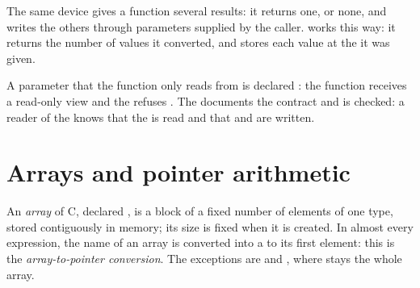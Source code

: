 The same device gives a function several results: it returns one, or none, and writes the others through 
parameters supplied by the caller.  works this way: it returns the number of values it converted, and
stores each value at the  it was given.

\label{lst:b1:pointers-and-arrays:divmod}


\label{lst:b1:pointers-and-arrays:read}


A  parameter that the function only reads from is declared : the function receives a
read-only view and the  refuses . The  documents the contract and is checked: a
reader of the   knows that the  is
read and that  and  are written.

\section{Arrays and pointer arithmetic}\label{sec:b1:pointers-and-arrays:arrays}

\begin{definition}\label{def:b1:pointers-and-arrays:array}
An \emph{array} of C, declared , is a block of a fixed number of elements of one type,
stored contiguously in memory; its size is fixed when it is created. In almost every expression, the name of an array
is converted into a  to its first element: this is the \emph{array-to-pointer
conversion}. The exceptions are  and , where 
stays the whole array.
\end{definition}

